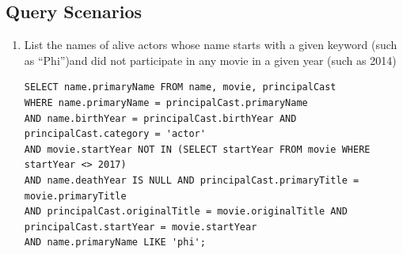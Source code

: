 \documentclass{sig-alternate}
\begin{document}
	\subsection{Query Scenarios}
	\begin{enumerate}
		\item List the names of alive actors whose name starts with a given keyword (such as “Phi”)and did not participate in any movie in a given year (such as 2014)\\
                \begin{lstlisting}
SELECT name.primaryName FROM name, movie, principalCast
WHERE name.primaryName = principalCast.primaryName
AND name.birthYear = principalCast.birthYear AND principalCast.category = 'actor'
AND movie.startYear NOT IN (SELECT startYear FROM movie WHERE startYear <> 2017)
AND name.deathYear IS NULL AND principalCast.primaryTitle = movie.primaryTitle
AND principalCast.originalTitle = movie.originalTitle AND principalCast.startYear = movie.startYear
AND name.primaryName LIKE 'phi';
                \end{lstlisting}


\end{enumerate}
\end{document}
